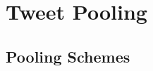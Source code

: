 \documentclass[10pt,a5paper,twoside]{article}
\begin{document}
\section{Tweet Pooling}

\subsection{Pooling Schemes}


\end{document}
